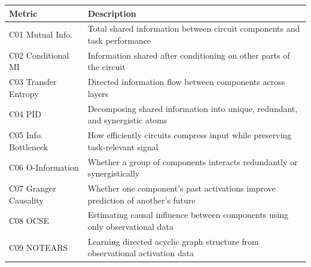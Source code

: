 \documentclass[10pt]{article}
\begin{document}
\begin{minipage}{\linewidth}
\par
\begin{center}

\begin{tabular}{@{}lp{10cm}@{}}
\toprule
\textbf{Metric} & \textbf{Description} \\
\midrule
C01 Mutual Info. & Total shared information between circuit components and task performance \\
\midrule
C02 Conditional MI & Information shared after conditioning on other parts of the circuit \\
\midrule
C03 Transfer Entropy & Directed information flow between components across layers \\
\midrule
C04 PID & Decomposing shared information into unique, redundant, and synergistic atoms \\
\midrule
C05 Info. Bottleneck & How efficiently circuits compress input while preserving task-relevant signal \\
\midrule
C06 O-Information & Whether a group of components interacts redundantly or synergistically \\
\midrule
C07 Granger Causality & Whether one component's past activations improve prediction of another's future \\
\midrule
C08 OCSE & Estimating causal influence between components using only observational data \\
\midrule
C09 NOTEARS & Learning directed acyclic graph structure from observational activation data \\
\bottomrule
\end{tabular}
\end{center}
\end{minipage}
\end{document}
